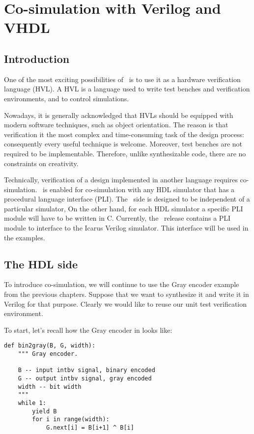 \chapter{Co-simulation with Verilog and VHDL}

\section{Introduction}

One of the most exciting possibilities of \myhdl\
is to use it as a hardware verification language (HVL).
A HVL is a language used to write test benches and
verification environments, and to control simulations.

Nowadays, it is generally acknowledged that HVLs should be equipped
with modern software techniques, such as object orientation. The
reason is that verification it the most complex and time-consuming
task of the design process: consequently every useful technique is
welcome. Moreover, test benches are not required to be
implementable. Therefore, unlike synthesizable code, there
are no constraints on creativity.

Technically, verification of a design implemented in
another language requires co-simulation. \myhdl\ is 
enabled for co-simulation with any HDL simulator that
has a procedural language interface (PLI). The \myhdl\
side is designed to be independent of a particular
simulator, On the other hand, for each HDL simulator a specific
PLI module will have to be written in C. Currently,
the \myhdl\ release contains a PLI module to interface
to the Icarus Verilog simulator. This interface will
be used in the examples.

\section{The HDL side}

To introduce co-simulation, we will continue to use the Gray encoder
example from the previous chapters. Suppose that we want to
synthesize it and write it in Verilog for that purpose. Clearly we would
like to reuse our unit test verification environment. 

To start, let's recall how the Gray encoder in \myhdl{} looks like:

\begin{verbatim}
def bin2gray(B, G, width):
    """ Gray encoder.

    B -- input intbv signal, binary encoded
    G -- output intbv signal, gray encoded
    width -- bit width
    """
    while 1:
        yield B
        for i in range(width):
            G.next[i] = B[i+1] ^ B[i]

\end{verbatim}

